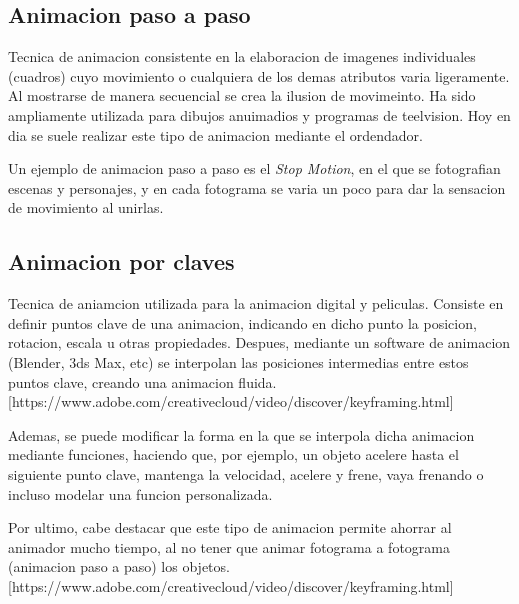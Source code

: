 \documentclass{article}
\begin{document}
\subsection{Animacion paso a paso}

Tecnica de animacion consistente en la elaboracion de imagenes individuales (cuadros) cuyo movimiento o cualquiera de los demas atributos varia ligeramente. Al mostrarse de manera secuencial se crea la ilusion de movimeinto. Ha sido ampliamente utilizada para dibujos anuimadios y programas de teelvision. Hoy en dia se suele realizar este tipo de animacion mediante el ordendador.

\bigskip

Un ejemplo de animacion paso a paso es el \textit{Stop Motion}, en el que se fotografian escenas y personajes, y en cada fotograma se varia un poco para dar la sensacion de movimiento al unirlas.


\subsection{Animacion por claves}

Tecnica de aniamcion utilizada para la animacion digital y peliculas. Consiste en definir puntos clave de una animacion, indicando en dicho punto la posicion, rotacion, escala u otras propiedades. Despues, mediante un software de animacion (Blender, 3ds Max, etc) se interpolan las posiciones intermedias entre estos puntos clave, creando una animacion fluida. [https://www.adobe.com/creativecloud/video/discover/keyframing.html]

\bigskip

Ademas, se puede modificar la forma en la que se interpola dicha animacion mediante funciones, haciendo que, por ejemplo, un objeto acelere hasta el siguiente punto clave, mantenga la velocidad, acelere y frene, vaya frenando o incluso modelar una funcion personalizada.

\bigskip

Por ultimo, cabe destacar que este tipo de animacion permite ahorrar al animador mucho tiempo, al no tener que animar fotograma a fotograma (animacion paso a paso) los objetos. [https://www.adobe.com/creativecloud/video/discover/keyframing.html]
\end{document}
